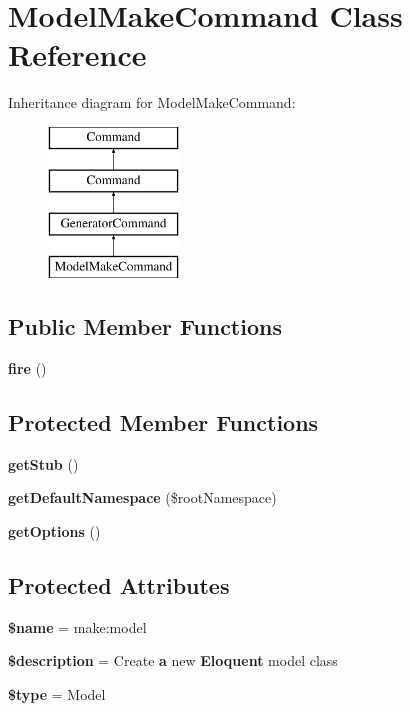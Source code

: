 \section{Model\+Make\+Command Class Reference}
\label{class_illuminate_1_1_foundation_1_1_console_1_1_model_make_command}
Inheritance diagram for Model\+Make\+Command\+:\begin{figure}[H]
\begin{center}
\leavevmode
\includegraphics[height=4.000000cm]{class_illuminate_1_1_foundation_1_1_console_1_1_model_make_command}
\end{center}
\end{figure}
\subsection*{Public Member Functions}
\begin{DoxyCompactItemize}
\item 
{\bf fire} ()
\end{DoxyCompactItemize}
\subsection*{Protected Member Functions}
\begin{DoxyCompactItemize}
\item 
{\bf get\+Stub} ()
\item 
{\bf get\+Default\+Namespace} (\$root\+Namespace)
\item 
{\bf get\+Options} ()
\end{DoxyCompactItemize}
\subsection*{Protected Attributes}
\begin{DoxyCompactItemize}
\item 
{\bf \$name} = \textquotesingle{}make\+:model\textquotesingle{}
\item 
{\bf \$description} = \textquotesingle{}Create {\bf a} new {\bf Eloquent} model class\textquotesingle{}
\item 
{\bf \$type} = \textquotesingle{}Model\textquotesingle{}
\end{DoxyCompactItemize}


